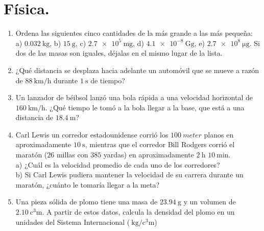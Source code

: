 \documentclass[14pt]{article}
\begin{document}
\section{Física.}

\begin{enumerate}
\item Ordena las siguientes cinco cantidades de la más grande a las más pequeña: \break \hfill a) $\SI{0.032}{\kilo\gram}$, b) $\SI{15}{\gram}$, c) $\SI{2.7e5}{\milli\gram}$, d) $\SI{4.1e-8}{\giga\gram}$, e) $\SI{2.7e8}{\micro\gram}$. Si dos de las masas son iguales, déjalas en el mismo lugar de la lista.
\item ¿Qué distancia se desplaza hacia adelante un automóvil que se mueve a razón de $\SI{88}{\kilo\meter\per\hour}$ durante $\SI{1}{\second}$ de tiempo?
\item Un lanzador de béibsol lanzó una bola rápida a una velocidad horizontal de $\SI{160}{\kilo\meter\per\hour}$. ¿Qué tiempo le tomó a la bola llegar a la base, que está a una distancia de $\SI{18.4}{\meter}$?
\item Carl Lewis un corredor estadounidense corrió los $\SI{100}{meter}$ planos en aproximadamente $\SI{10}{\second}$, mientras que el corredor Bill Rodgers corrió el maratón ($26$ millas con $385$ yardas) en aproximadamente $\SI{2}{\hour}$ $\SI{10}{\minute}$.
\\
a) ¿Cuál es la velocidad promedio de cada uno de los corredores? \\
b) Si Carl Lewis pudiera mantener la velocidad de su carrera durante un maratón, ¿cuánto le tomaría llegar a la meta?
\item Una pieza sólida de plomo tiene una masa de $\SI{23.94}{\gram}$ y un volumen de $\SI{2.10}{\cubic\centi\meter}$. A partir de estos datos, calcula la densidad del plomo en un unidades del Sistema Internacional ($\SI{}{\kilo\gram\per\cubic\centi\meter}$)
\end{enumerate}
\end{document}
